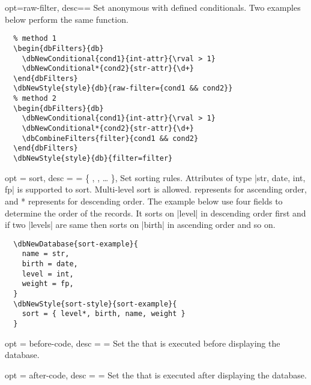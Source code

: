 \documentclass[full]{l3doc}
\begin{document}
\begin{documentation}
\begin{option}{opt=raw-filter, desc={= }}
  Set anonymous with defined conditionals. Two examples below perform the same
  function.
\end{option}

\begin{verbatim}
  % method 1
  \begin{dbFilters}{db}
    \dbNewConditional{cond1}{int-attr}{\rval > 1}
    \dbNewConditional*{cond2}{str-attr}{\d+}
  \end{dbFilters}
  \dbNewStyle{style}{db}{raw-filter={cond1 && cond2}}
  % method 2
  \begin{dbFilters}{db}
    \dbNewConditional{cond1}{int-attr}{\rval > 1}
    \dbNewConditional*{cond2}{str-attr}{\d+}
    \dbCombineFilters{filter}{cond1 && cond2}
  \end{dbFilters}
  \dbNewStyle{style}{db}{filter=filter}
\end{verbatim}

\begin{option}{
  opt = sort,
  desc = {= \{ , , \ldots{} \}},
}
  Set sorting rules. Attributes of type |str, date, int, fp| is supported to
  sort.  Multi-level sort is allowed.  represents for ascending
  order, and * represents for descending order. The example below
  use four fields to determine the order of the records. It sorts on |level|
  in descending order first and if two |levels| are same then sorts on |birth|
  in ascending order and so on.
\end{option}

\begin{verbatim}
  \dbNewDatabase{sort-example}{
    name = str,
    birth = date,
    level = int,
    weight = fp,
  }
  \dbNewStyle{sort-style}{sort-example}{
    sort = { level*, birth, name, weight }
  }
\end{verbatim}

\begin{option}{
  opt = before-code,
  desc = {= }
}
  Set the  that is executed before displaying the database.
\end{option}

\begin{option}{
  opt = after-code,
  desc = {= }
}
  Set the  that is executed after displaying the database.
\end{option}


\end{documentation}
\end{document}
